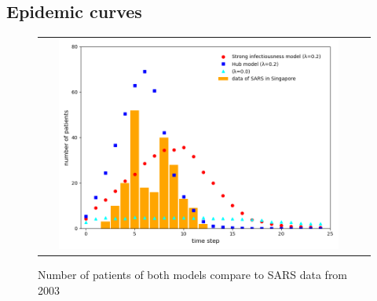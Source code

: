 \documentclass{article}
\begin{document}
\subsection{Epidemic curves}

\begin{figure}[!htbp]
    \centering
    \begin{tabular}{cc}
        \includegraphics[width=0.9\textwidth]{fig/epidemic_curve.png}
    \end{tabular}
    \caption{Number of patients of both models compare to SARS data from 2003}
    \label{fig:epidemic_curve}
\end{figure}
\end{document}
